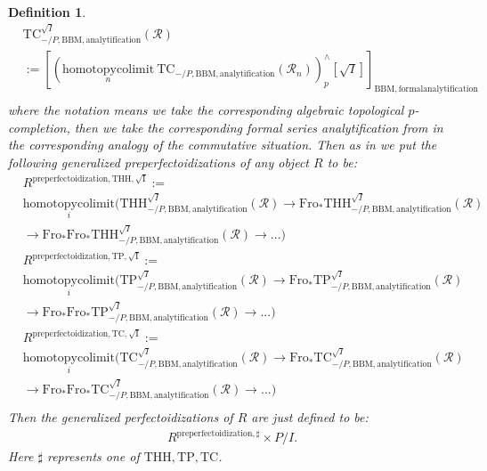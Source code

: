\documentclass[12pt]{book}
\newtheorem{definition}{Definition}
\begin{document}
\begin{definition}
\begin{align}
& \mathrm{TC}^{\sqrt{I}}_{-/P,\mathrm{BBM},\mathrm{analytification}}(\mathcal{R})\\
&:=[(\underset{n}{\mathrm{homotopycolimit}}~  \mathrm{TC}_{-/P,\mathrm{BBM},\mathrm{analytification}}(\mathcal{R}_n))^\wedge_{p}[{\sqrt{I}}]]_{\mathrm{BBM},\mathrm{formalanalytification}}\\	
\end{align}
where the notation means we take the corresponding algebraic topological $p$-completion, then we take the corresponding formal series analytification from \cite[4.2]{BBM} in the corresponding analogy of the commutative situation. Then as in \cite[Definition 8.2]{BS} we put the following generalized preperfectoidizations of any object $R$ to be:
\begin{align}
&R^\mathrm{preperfectoidization,THH,{\sqrt{I}}}:=\\
&\underset{i}{\mathrm{homotopycolimit}}(\mathrm{THH}^{\sqrt{I}}_{-/P,\mathrm{BBM},\mathrm{analytification}}(\mathcal{R})\rightarrow \mathrm{Fro}_*\mathrm{THH}^{\sqrt{I}}_{-/P,\mathrm{BBM},\mathrm{analytification}}(\mathcal{R})\\
&\rightarrow \mathrm{Fro}_*\mathrm{Fro}_*\mathrm{THH}^{\sqrt{I}}_{-/P,\mathrm{BBM},\mathrm{analytification}}(\mathcal{R})\rightarrow...)	\\
&R^\mathrm{preperfectoidization,TP,{\sqrt{I}}}:=\\
&\underset{i}{\mathrm{homotopycolimit}}(\mathrm{TP}^{\sqrt{I}}_{-/P,\mathrm{BBM},\mathrm{analytification}}(\mathcal{R})\rightarrow \mathrm{Fro}_*\mathrm{TP}^{\sqrt{I}}_{-/P,\mathrm{BBM},\mathrm{analytification}}(\mathcal{R})\\
&\rightarrow \mathrm{Fro}_*\mathrm{Fro}_*\mathrm{TP}^{\sqrt{I}}_{-/P,\mathrm{BBM},\mathrm{analytification}}(\mathcal{R})\rightarrow...)	\\
&R^\mathrm{preperfectoidization,TC,{\sqrt{I}}}:=\\
&\underset{i}{\mathrm{homotopycolimit}}(\mathrm{TC}^{\sqrt{I}}_{-/P,\mathrm{BBM},\mathrm{analytification}}(\mathcal{R})\rightarrow \mathrm{Fro}_*\mathrm{TC}^{\sqrt{I}}_{-/P,\mathrm{BBM},\mathrm{analytification}}(\mathcal{R})\\
&\rightarrow \mathrm{Fro}_*\mathrm{Fro}_*\mathrm{TC}^{\sqrt{I}}_{-/P,\mathrm{BBM},\mathrm{analytification}}(\mathcal{R})\rightarrow...)	\\
\end{align}
Then the generalized perfectoidizations of $R$ are just defined to be:
\begin{align}
R^\mathrm{preperfectoidization,\sharp}\times P/I.	
\end{align}
Here $\sharp$ represents one of $\mathrm{THH},\mathrm{TP},\mathrm{TC}$.
\end{definition}
\end{document}
